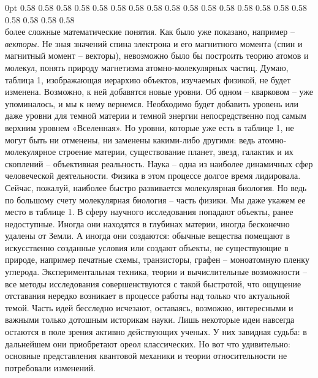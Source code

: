 \begin{multicols}{2}
  0pt \columnwidth%
  0pt 0.58\columnwidth%
  0pt 0.58\columnwidth%
  0pt 0.58\columnwidth%
  0pt 0.58\columnwidth%
  0pt 0.58\columnwidth%
  0pt 0.58\columnwidth%
  0pt 0.58\columnwidth%
  0pt 0.58\columnwidth%
  0pt 0.58\columnwidth%
  0pt 0.58\columnwidth%
  0pt 0.58\columnwidth%
  0pt 0.58\columnwidth%
  0pt 0.58\columnwidth%
  0pt 0.58\columnwidth%
  0pt 0.58\columnwidth%
  0pt 0.58\columnwidth%
  0pt 0.58\columnwidth%
  0pt 0.58\columnwidth%
  0pt 0.58\columnwidth%
  0pt 0.58\columnwidth%
  0pt \columnwidth%
\hfill%
\\[-2\baselineskip]
более сложные математические понятия.
Как было уже показано, например – \textit{векторы}. Не зная значений спина электрона и его
магнитного момента (спин и магнитный момент – векторы), невозможно было бы построить
теорию атомов и молекул, понять природу магнетизма атомно-молекулярных частиц.
Думаю, таблица 1, изображающая иерархию объектов, изучаемых физикой, не будет изменена. Возможно, к ней добавятся новые уровни. Об одном
– кварковом – уже упоминалось, и мы к нему вернемся.
Необходимо будет добавить
уровень или даже уровни для
темной материи и темной энергии непосредственно под
самым верхним уровнем «Вселенная». Но уровни,
которые уже есть в таблице 1, не могут быть ни
отменены, ни заменены какими-либо другими: ведь
атомно-молекулярное строение материи, существование планет, звезд, галактик и их скоплений – объективная реальность.
Наука – одна из наиболее динамичных сфер человеческой деятельности. Физика в этом процессе долгое
время лидировала. Сейчас, пожалуй, наиболее быстро
развивается молекулярная биология. Но ведь по большому счету молекулярная биология – часть физики.
Мы даже укажем ее место в таблице 1.
В сферу научного исследования попадают объекты,
ранее недоступные. Иногда они находятся в глубинах
материи, иногда бесконечно удалены от Земли. А
иногда они создаются: обычные вещества помещают в
искусственно созданные условия или создают объекты,
не существующие в природе, например печатные схемы, транзисторы, графен – моноатомную пленку углерода. Экспериментальная техника, теории и вычислительные возможности – все методы исследования совершенствуются с такой быстротой, что ощущение
отставания нередко возникает в процессе работы над
только что актуальной темой. Часть идей бесследно
исчезают, оставаясь, возможно, интересными и важными только дотошным историкам науки. Лишь некоторые идеи навсегда остаются в поле зрения активно
действующих ученых. У них завидная судьба: в дальнейшем они приобретают ореол классических.
Но вот что удивительно: основные представления квантовой механики и теории относительности не потребовали изменений.


\end{multicols}
